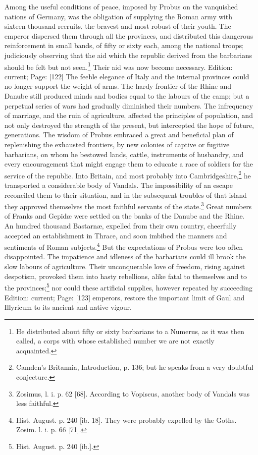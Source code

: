 Among the useful conditions of peace, imposed by Probus on the vanquished nations of Germany, was the obligation of supplying the Roman army with sixteen thousand recruits, the bravest and most robust of their youth. The emperor dispersed them through all the provinces, and distributed this dangerous reinforcement in small bands, of fifty or sixty each, among the national troops; judiciously observing that the aid which the republic derived from the barbarians should be felt but not seen.\footnote{He distributed about fifty or sixty barbarians to a Numerus, as it was then called, a corps with whose established number we are not exactly acquainted.} Their aid was now become necessary. Edition: current; Page: [122] The feeble elegance of Italy and the internal provinces could no longer support the weight of arms. The hardy frontier of the Rhine and Danube still produced minds and bodies equal to the labours of the camp; but a perpetual series of wars had gradually diminished their numbers. The infrequency of marriage, and the ruin of agriculture, affected the principles of population, and not only destroyed the strength of the present, but intercepted the hope of future, generations. The wisdom of Probus embraced a great and beneficial plan of replenishing the exhausted frontiers, by new colonies of captive or fugitive barbarians, on whom he bestowed lands, cattle, instruments of husbandry, and every encouragement that might engage them to educate a race of soldiers for the service of the republic. Into Britain, and most probably into Cambridgeshire,\footnote{Camden\texthebrew{}’s Britannia, Introduction, p. 136; but he speaks from a very doubtful conjecture.} he transported a considerable body of Vandals. The impossibility of an escape reconciled them to their situation, and in the subsequent troubles of that island they approved themselves the most faithful servants of the state.\footnote{Zosimus, l. i. p. 62 [68]. According to Vopiscus, another body of Vandals was less faithful.} Great numbers of Franks and Gepidæ were settled on the banks of the Danube and the Rhine. An hundred thousand Bastarnæ, expelled from their own country, cheerfully accepted an establishment in Thrace, and soon imbibed the manners and sentiments of Roman subjects.\footnote{Hist. August. p. 240 [ib. 18]. They were probably expelled by the Goths. Zosim. l. i. p. 66 [71].} But the expectations of Probus were too often disappointed. The impatience and idleness of the barbarians could ill brook the slow labours of agriculture. Their unconquerable love of freedom, rising against despotism, provoked them into hasty rebellions, alike fatal to themselves and to the provinces;\footnote{Hist. August. p. 240 [ib.].} nor could these artificial supplies, however repeated by succeeding Edition: current; Page: [123] emperors, restore the important limit of Gaul and Illyricum to its ancient and native vigour.

